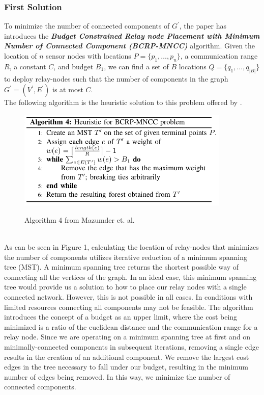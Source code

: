 \documentclass{article}
\begin{document}
\subsubsection*{First Solution}
To minimize the number of connected components of $G^\prime$, the paper \cite{relay-node} has introduces the \textbf{\textit{Budget Constrained Relay node Placement with Minimum Number of Connected Component (BCRP-MNCC)}} algorithm.
Given the location of $n$ sensor nodes with locations $P=\{p_1, \hdots, p_n\}$, a communication range $R$, a constant $C$, and budget $B_1$, we can find a set of $B$ locations $Q=\{q_1, \hdots, q_{|B|}\}$ to deploy relay-nodes such that the number of components in the graph $G^\prime=(V^\prime, E^\prime)$ is at most $C$.\\
The following algorithm is the heuristic solution to this problem offered by \cite{relay-node}.
\begin{figure}[h]
\centering
\includegraphics[width=0.9\textwidth]{Alg4.png}
\label{alg4}
\caption{Algorithm 4 from Mazumder et. al.}
\end{figure}\\
As can be seen in Figure 1, calculating the location of relay-nodes that minimizes the number of components utilizes iterative reduction of a minimum spanning tree (MST).
A minimum spanning tree returns the shortest possible way of connecting all the vertices of the graph.
In an ideal case, this minimum spanning tree would provide us a solution to how to place our relay nodes with a single connected network.
However, this is not possible in all cases.
In conditions with limited resources connecting all components may not be feasible.
The algorithm introduces the concept of a budget as an upper limit, where the cost being minimized is a ratio of the euclidean distance and the communication range for a relay node.
Since we are operating on a minimum spanning tree at first and on minimally-connected components in subsequent iterations, removing a single edge results in the creation of an additional component.
We remove the largest cost edges in the tree necessary to fall under our budget, resulting in the minimum number of edges being removed.
In this way, we minimize the number of connected components.\\
\end{document}
